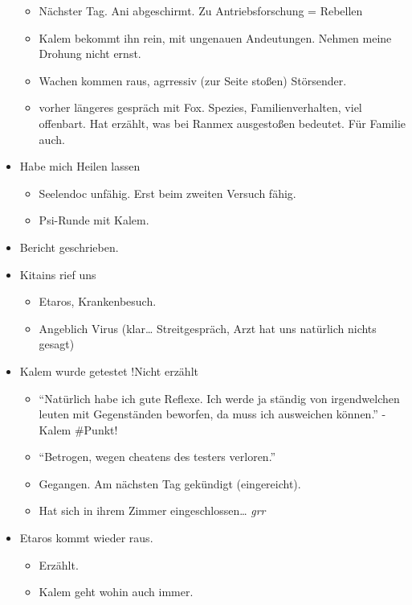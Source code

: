 \documentclass[11pt]{scrartcl}
\begin{document}
\begin{itemize}
  \begin{itemize}
  \item
    Nächster Tag. Ani abgeschirmt. Zu Antriebsforschung = Rebellen
  \item
    Kalem bekommt ihn rein, mit ungenauen Andeutungen. Nehmen meine
    Drohung nicht ernst.
  \item
    Wachen kommen raus, agrressiv (zur Seite stoßen) Störsender.
  \item
    vorher längeres gespräch mit Fox. Spezies, Familienverhalten, viel
    offenbart. Hat erzählt, was bei Ranmex ausgestoßen bedeutet. Für
    Familie auch.
  \end{itemize}
\item
  Habe mich Heilen lassen

  \begin{itemize}
  \item
    Seelendoc unfähig. Erst beim zweiten Versuch fähig.
  \item
    Psi-Runde mit Kalem.
  \end{itemize}
\item
  Bericht geschrieben.
\item
  Kitains rief uns

  \begin{itemize}
  \item
    Etaros, Krankenbesuch.
  \item
    Angeblich Virus (klar\ldots{} Streitgespräch, Arzt hat uns natürlich
    nichts gesagt)
  \end{itemize}
\item
  Kalem wurde getestet !Nicht erzählt

  \begin{itemize}
  \item
    ``Natürlich habe ich gute Reflexe. Ich werde ja ständig von
    irgendwelchen leuten mit Gegenständen beworfen, da muss ich
    ausweichen können.'' -Kalem \#Punkt!
  \item
    ``Betrogen, wegen cheatens des testers verloren.''
  \item
    Gegangen. Am nächsten Tag gekündigt (eingereicht).
  \item
    Hat sich in ihrem Zimmer eingeschlossen\ldots{} \emph{grr}
  \end{itemize}
\item
  Etaros kommt wieder raus.

  \begin{itemize}
  \item
    Erzählt.
  \item
    Kalem geht wohin auch immer.
  \end{itemize}
\end{itemize}
\end{document}
